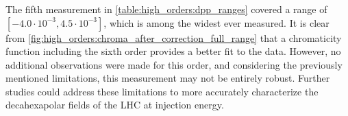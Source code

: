 \subsubsection{}

The fifth measurement in \cref{table:high_orders:dpp_ranges} covered a range of $[-4.0 \cdot
10^{-3}, 4.5 \cdot 10^{-3}]$, which is among the widest ever measured. It is clear from
\cref{fig:high_orders:chroma_after_correction_full_range} that a chromaticity function including the
sixth order provides a better fit to the data. However, no additional observations were made for
this order, and considering the previously mentioned limitations, this measurement may not be
entirely robust. Further studies could address these limitations to more accurately characterize the
decahexapolar fields of the LHC at injection energy.

